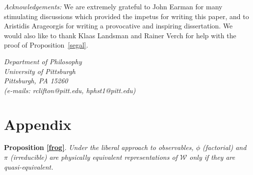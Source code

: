 \documentclass[12pt]{article}
\theoremstyle{remark}
\theoremstyle{definition}
\newcommand{\alg}[1]{\mathcal{#1}}
\begin{document}
\noindent\emph{Acknowledgements:} We are extremely
grateful to John Earman for many stimulating discussions which
provided the impetus for writing this paper, and to Aristidis
Arageorgis for writing a provocative and inspiring dissertation.  We
would also like to thank Klaas Landsman and Rainer Verch for help with
the proof of Proposition~\ref{segal}. \vspace{1em}

{\flushright \emph{Department of Philosophy} \\
  \emph{University of Pittsburgh} \\
  \emph{Pittsburgh, PA 15260}  \\
  \emph{(e-mails: rclifton@pitt.edu, hphst1@pitt.edu)} \\ }
\vspace{2em}

\section*{Appendix}
\noindent \textbf{Proposition \ref{frog}}. \emph{Under the liberal approach to observables, 
  $\phi$ (factorial) and $\pi$ (irreducible) are physically equivalent
  representations of $\alg{W}$ only if they are quasi-equivalent.}
\end{document}
